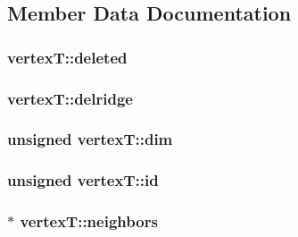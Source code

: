 \subsection{Member Data Documentation}
\hypertarget{structvertexT_aa6ead0ea4db6a5c2e73cff70ea1ec7af}{}
\subsubsection[{deleted}]{ vertex\+T\+::deleted}\label{structvertexT_aa6ead0ea4db6a5c2e73cff70ea1ec7af}
\hypertarget{structvertexT_a4e576aa2050db6ca1b8cbb77431daa7e}{}
\subsubsection[{delridge}]{ vertex\+T\+::delridge}\label{structvertexT_a4e576aa2050db6ca1b8cbb77431daa7e}
\hypertarget{structvertexT_a4f6f2bc224507c747313d356114e9b42}{}
\subsubsection[{dim}]{\setlength{\rightskip}{0pt plus 5cm}unsigned vertex\+T\+::dim}\label{structvertexT_a4f6f2bc224507c747313d356114e9b42}
\hypertarget{structvertexT_a06ea1b3346302aaf47f6ad95bfa98511}{}
\subsubsection[{id}]{\setlength{\rightskip}{0pt plus 5cm}unsigned vertex\+T\+::id}\label{structvertexT_a06ea1b3346302aaf47f6ad95bfa98511}
\hypertarget{structvertexT_ad491be4b8463d54fedb2ceba42fadd08}{}
\subsubsection[{neighbors}]{$\ast$ vertex\+T\+::neighbors}\label{structvertexT_ad491be4b8463d54fedb2ceba42fadd08}
\hypertarget{structvertexT_a6183d13d33e19cc8b8862899ac707b96}{}
